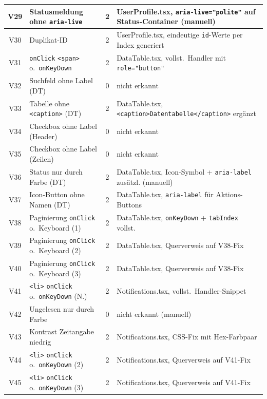 \begin{longtable}{|c|p{5.0cm}|c|p{5.4cm}|}
V29  & Statusmeldung ohne \texttt{aria-live}        & 2 & UserProfile.tsx, \texttt{aria-live="polite"} auf Status-Container (manuell) \\ \hline
V30  & Duplikat-ID                                  & 2 & UserProfile.tsx, eindeutige \texttt{id}-Werte per Index generiert \\ \hline
V31  & \texttt{onClick} \texttt{<span>} o.\ \texttt{onKeyDown} & 2 & DataTable.tsx, vollst.\ Handler mit \texttt{role="button"} \\ \hline
V32  & Suchfeld ohne Label (DT)                     & 0 & nicht erkannt \\ \hline
V33  & Tabelle ohne \texttt{<caption>} (DT)         & 2 & DataTable.tsx, \texttt{<caption>Datentabelle</caption>} ergänzt \\ \hline
V34  & Checkbox ohne Label (Header)                 & 0 & nicht erkannt \\ \hline
V35  & Checkbox ohne Label (Zeilen)                 & 0 & nicht erkannt \\ \hline
V36  & Status nur durch Farbe (DT)                  & 2 & DataTable.tsx, Icon-Symbol + \texttt{aria-label} zusätzl. (manuell) \\ \hline
V37  & Icon-Button ohne Namen (DT)                  & 2 & DataTable.tsx, \texttt{aria-label} für Aktions-Buttons \\ \hline
V38  & Paginierung \texttt{onClick} o.\ Keyboard (1) & 2 & DataTable.tsx, \texttt{onKeyDown} + \texttt{tabIndex} vollst. \\ \hline
V39  & Paginierung \texttt{onClick} o.\ Keyboard (2) & 2 & DataTable.tsx, Querverweis auf V38-Fix \\ \hline
V40  & Paginierung \texttt{onClick} o.\ Keyboard (3) & 2 & DataTable.tsx, Querverweis auf V38-Fix \\ \hline
V41  & \texttt{<li>} \texttt{onClick} o.\ \texttt{onKeyDown} (N.) & 2 & Notifications.tsx, vollst.\ Handler-Snippet \\ \hline
V42  & Ungelesen nur durch Farbe                    & 0 & nicht erkannt (manuell) \\ \hline
V43  & Kontrast Zeitangabe niedrig                  & 2 & Notifications.tsx, CSS-Fix mit Hex-Farbpaar \\ \hline
V44  & \texttt{<li>} \texttt{onClick} o.\ \texttt{onKeyDown} (2) & 2 & Notifications.tsx, Querverweis auf V41-Fix \\ \hline
V45  & \texttt{<li>} \texttt{onClick} o.\ \texttt{onKeyDown} (3) & 2 & Notifications.tsx, Querverweis auf V41-Fix \\ \hline

\end{longtable}

